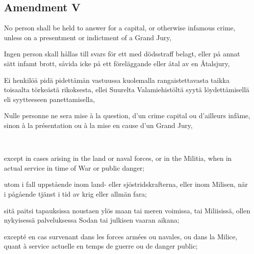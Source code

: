 \documentclass[a4paper,landscape,12pt]{article}
\begin{document}
\subsection*{Amendment V}
\begin{minipage}[t]{0.22\textwidth}
No person shall be held to answer for a capital, or otherwise infamous crime, unless on a presentment or indictment of a Grand Jury,
\end{minipage}\textwidth
\begin{minipage}[t]{0.22\textwidth}
Ingen person skall hållas till svars för ett med dödsstraff belagt, eller på annat sätt infamt brott, såvida icke på ett föreläggande eller åtal av en Åtalsjury,
\end{minipage}\textwidth
\begin{minipage}[t]{0.22\textwidth}
Ei henkilöä pidä pidettämän vastuussa kuolemalla rangaistettavasta taikka toisaalta törkeästä rikoksesta, ellei Suurelta Valamiehistöltä syytä löydettämisellä eli syytteeseen panettamisella,
\end{minipage}\textwidth
\begin{minipage}[t]{0.22\textwidth}
Nulle personne ne sera mise à la question, d'un crime capital ou d'ailleurs infâme, sinon à la présentation ou à la mise en cause d'un Grand Jury,
\end{minipage}

~

\begin{minipage}[t]{0.22\textwidth}
except in cases arising in the land or naval forces, or in the Militia, when in actual service in time of War or public danger;
\end{minipage}\textwidth
\begin{minipage}[t]{0.22\textwidth}
utom i fall uppstående inom land- eller sjöstridskrafterna, eller inom Milisen, när i pågående tjänst i tid av krig eller allmän fara;
\end{minipage}\textwidth
\begin{minipage}[t]{0.22\textwidth}
sitä paitsi tapauksissa noustaen ylös maan tai meren voimissa, tai Miliisissä, ollen nykyisessä palveluksessa Sodan tai julkisen vaaran aikana;
\end{minipage}\textwidth
\begin{minipage}[t]{0.22\textwidth}
excepté en cas survenant dans les forces armées ou navales, ou dans la Milice, quant à service actuelle en temps de guerre ou de danger public;
\end{minipage}
\end{document}
